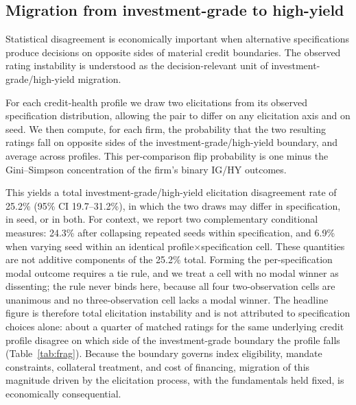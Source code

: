 \documentclass[a4paper,fleqn]{cas-sc}
\begin{document}
\subsection{Migration from investment-grade to high-yield}\label{sec:ighy}
Statistical disagreement is economically important when alternative specifications produce decisions on
opposite sides of material credit boundaries. The observed rating instability is understood as the
decision-relevant unit of investment-grade/high-yield migration.

For each credit-health profile we draw two elicitations from its observed specification distribution,
allowing the pair to differ on any elicitation axis and on seed. We then compute, for each firm, the
probability that the two resulting ratings fall on opposite sides of the investment-grade/high-yield
boundary, and average across profiles. This per-comparison flip probability is one minus the
Gini--Simpson concentration of the firm's binary IG/HY outcomes.

This yields a total investment-grade/high-yield elicitation disagreement rate of 25.2\%
(95\% CI 19.7--31.2\%), in which the two draws may differ in specification, in seed, or in both.
For context, we report two complementary conditional measures: 24.3\% after collapsing repeated
seeds within specification, and 6.9\% when varying seed within an identical
profile$\times$specification cell. These quantities are not additive components of the 25.2\%
total. Forming the per-specification modal outcome requires a tie rule, and we treat a cell with no
modal winner as dissenting; the rule never binds here, because all four two-observation cells are
unanimous and no three-observation cell lacks a modal winner. The headline figure is therefore
total elicitation instability and is not attributed to specification choices alone: about a quarter of
matched ratings for the same underlying credit profile disagree on which side of the investment-grade
boundary the profile falls (Table~\ref{tab:frag}). Because the boundary governs index eligibility,
mandate constraints, collateral treatment, and cost of financing, migration of this magnitude driven
by the elicitation process, with the fundamentals held fixed, is economically consequential.
\end{document}
